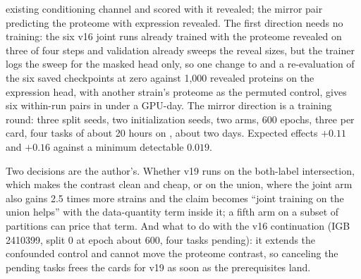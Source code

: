\begin{itemize}
  existing conditioning channel and scored with it revealed; the mirror pair predicting the
  proteome with expression revealed. The first direction needs no training: the six v16 joint
  runs already trained with the proteome revealed on three of four steps and validation already
  sweeps the reveal sizes, but the trainer logs the sweep for the masked head only, so one
  change to  and a re-evaluation of the six saved checkpoints at
  zero against 1,000 revealed proteins on the expression head, with another strain's proteome as
  the permuted control, gives six within-run pairs in under a GPU-day. The mirror direction is a
  training round: three split seeds, two initialization seeds, two arms, 600 epochs, three per
  card, four tasks of about 20 hours on , about two days. Expected effects $+0.11$
  and $+0.16$ against a minimum detectable $0.019$.
\end{itemize}

Two decisions are the author's. Whether v19 runs on the both-label intersection, which makes
the contrast clean and cheap, or on the union, where the joint arm also gains 2.5 times more
strains and the claim becomes ``joint training on the union helps'' with the data-quantity term
inside it; a fifth arm on a subset of partitions can price that term. And what to do with the
v16 continuation (IGB 2410399, split 0 at epoch about 600, four tasks pending): it extends the
confounded control and cannot move the proteome contrast, so canceling the pending tasks frees
the  cards for v19 as soon as the prerequisites land.

